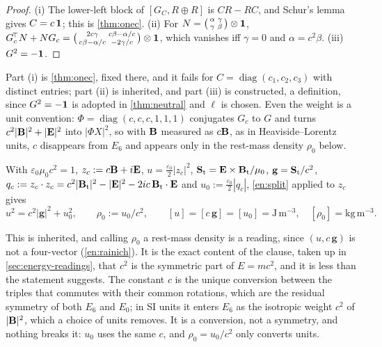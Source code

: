 \begin{proof}
(i) The lower-left block of $[G_C,R\oplus R]$ is $CR-RC$, and Schur's lemma gives $C=c\,\mathbf 1$; this is \cref{thm:onec}. (ii) For
$N=\bigl(\begin{smallmatrix}\alpha&\gamma\\ \gamma&\beta\end{smallmatrix}\bigr)\otimes\mathbf 1$,
$G_c^{\!\top}N+NG_c=\bigl(\begin{smallmatrix}2c\gamma&c\beta-\alpha/c\\ c\beta-\alpha/c&-2\gamma/c\end{smallmatrix}\bigr)\otimes\mathbf 1$, which vanishes iff
$\gamma=0$ and $\alpha=c^2\beta$. (iii) $G^2=-\mathbf 1$.
\end{proof}

Part (i) is \cref{thm:onec}, fixed there, and it fails for $C=\operatorname{diag}(c_1,c_2,c_3)$ with distinct entries; part (ii) is inherited, and
part (iii) is constructed, a definition, since $G^2=-\mathbf 1$ is adopted in \cref{thm:neutral} and $\ell$ is chosen. Even the weight is a unit convention: $\Phi=\operatorname{diag}(c,c,c,1,1,1)$
conjugates $G_c$ to $G$ and turns $c^2|\mathbf B|^2+|\mathbf E|^2$ into $|\Phi X|^2$, so with $\mathbf B$ measured as $c\mathbf B$, as in Heaviside--Lorentz units, $c$
disappears from $E_6$ and appears only in the rest-mass density $\rho_0$ below.

\begin{proposition}[SI form]
\label{en:SI}
With $\varepsilon_0\mu_0c^2=1$, $z_c:=c\mathbf B+i\mathbf E$, $u=\tfrac{\varepsilon_0}2|z_c|^2$, $\mathbf S_{\rm t}=\mathbf E\times\mathbf B_{\rm t}/\mu_0$, $\mathbf g=\mathbf S_{\rm t}/c^2$,
$q_c:=z_c\cdot z_c=c^2|\mathbf B_{\rm t}|^2-|\mathbf E|^2-2ic\,\mathbf B_{\rm t}\cdot\mathbf E$ and $u_0:=\tfrac{\varepsilon_0}2|q_c|$, \cref{en:split} applied to $z_c$ gives
\begin{equation}
\label{en:SIeq}
u^2=c^2|\mathbf g|^2+u_0^2,\qquad \rho_0:=u_0/c^2,\qquad [u]=[c\,\mathbf g]=[u_0]=\mathrm{J\,m^{-3}},\quad [\rho_0]=\mathrm{kg\,m^{-3}} .
\end{equation}
\end{proposition}

This is inherited, and calling $\rho_0$ a rest-mass density is a reading, since $(u,c\,\mathbf g)$ is not a four-vector (\cref{en:rainich}).
It is the exact content of the clause, taken up in \cref{sec:energy-readings}, that $c^2$ is the symmetric part of $E=mc^2$, and it is less than the statement suggests. The constant $c$
is the unique conversion between the triples that commutes with their common rotations, which are the residual symmetry of both $E_6$ and $E_0$;
in SI units it enters $E_6$ as the isotropic weight $c^2$ of $|\mathbf B|^2$, which a choice of units removes. It is a conversion, not a symmetry, and
nothing breaks it: $u_0$ uses the same $c$, and $\rho_0=u_0/c^2$ only converts units.

